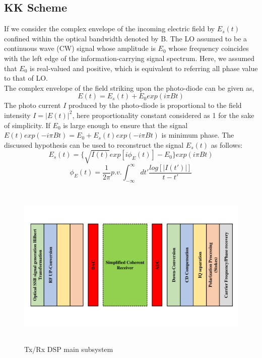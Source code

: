 \subsection{KK Scheme}
If we consider the complex envelope of the incoming electric field by $E_s(t)$ confined within the optical bandwidth denoted by B. The LO assumed to be a continuous wave (CW) signal whose amplitude is $E_0$ whose frequency coincides with the left edge of the information-carrying signal spectrum. Here, we assumed that $E_0$ is real-valued and positive, which is equivalent to referring all phase value to that of LO.\\
The complex envelope of the field striking upon the photo-diode can be given as,
\begin{equation}
E(t)=E_s(t)+E_0 exp(i\pi Bt)
\end{equation}
The photo current $I$ produced by the photo-diode is proportional to the field intensity $I=|E(t)|^2$, here proportionality constant considered as 1 for the sake of simplicity. If $E_0$ is large enough to ensure that the signal $E(t)exp(-i\pi Bt)=E_0+E_s(t)exp(-i\pi Bt)$ is minimum phase. The discussed hypothesis can be used to reconstruct the signal $E_s(t)$ as follows:
\begin{equation}
E_s(t)=\{\sqrt{I(t)} exp[i\phi_E(t)]-E_0\} exp(i\pi Bt)
\end{equation}
\begin{equation}
\phi_E(t)=\dfrac{1}{2\pi} p.v. \int_{-\infty}^{\infty} dt' \frac{log[|I(t')|]}{t-t'}
\label{Eq:5.19}
\end{equation}
\begin{figure}[h]
	\centering
	\includegraphics[width=1.0\textwidth, height=8cm]{./sdf/simplified_coherent_receiver/figures/detailed_subsystem.pdf}
	\caption{Tx/Rx DSP main subsystem}\label{DSP_main_subsystem}
\end{figure}

